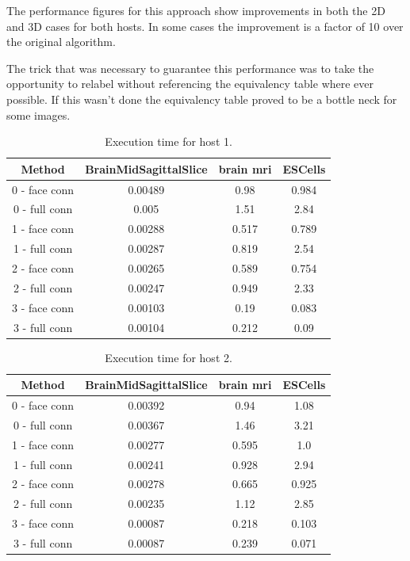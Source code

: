 \documentclass{InsightArticle}
\begin{document}
The performance figures for this approach show improvements in both
the 2D and 3D cases for both hosts. In some cases the improvement is a
factor of 10 over the original algorithm.

The trick that was necessary to guarantee this performance was to take
the opportunity to relabel without referencing the equivalency table
where ever possible. If this wasn't done the equivalency table proved
to be a bottle neck for some images.

\begin{table}[htbp]
\centering
\begin{tabular}{|c|c|c|c|}
\hline
Method & BrainMidSagittalSlice & brain mri & ESCells \\
\hline
\hline
0 - face conn & 0.00489   & 0.98 & 0.984 \\
0 - full conn & 0.005     & 1.51 & 2.84 \\
\hline
1 - face conn & 0.00288   & 0.517 & 0.789 \\
1 - full conn & 0.00287   & 0.819 & 2.54 \\
\hline
2 - face conn & 0.00265   & 0.589 & 0.754 \\
2 - full conn & 0.00247   & 0.949 & 2.33 \\
\hline
3 - face conn & 0.00103   & 0.19 & 0.083 \\
3 - full conn & 0.00104   & 0.212 & 0.09 \\
\hline
\end{tabular}
\caption{Execution time for host 1. \label{tbl:timing1}}
\end{table}

\begin{table}[htbp]
\centering
\begin{tabular}{|c|c|c|c|}
\hline
Method & BrainMidSagittalSlice & brain mri & ESCells \\
\hline
\hline
0 - face conn & 0.00392   & 0.94 & 1.08 \\
0 - full conn & 0.00367   & 1.46 & 3.21 \\
\hline
1 - face conn & 0.00277   & 0.595 & 1.0 \\
1 - full conn & 0.00241   & 0.928 & 2.94 \\
\hline
2 - face conn & 0.00278   & 0.665 & 0.925 \\
2 - full conn & 0.00235   & 1.12 & 2.85 \\
\hline
3 - face conn & 0.00087   & 0.218 & 0.103 \\
3 - full conn & 0.00087   & 0.239 & 0.071 \\
\hline
\end{tabular}
\caption{Execution time for host 2. \label{tbl:timing2}}
\end{table}
\end{document}
